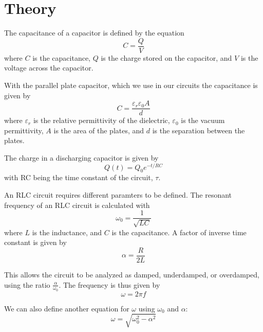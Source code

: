 \documentclass[11pt]{article}
\let\oldsection\section
\renewcommand\section{\clearpage\oldsection}
\begin{document}
    \section*{Theory}\label{sec:theory}

    The capacitance of a capacitor is defined by the equation
    \begin{equation}
        C = \frac{Q}{V}
    \end{equation}\label{eq:capacitance}
    where $C$ is the capacitance, $Q$ is the charge stored on the capacitor, and $V$ is the voltage across the capacitor.

    With the parallel plate capacitor, which we use in our circuits the capacitance is given by
    \begin{equation}
        C = \frac{\varepsilon_r \varepsilon_0 A}{d}
    \end{equation}\label{eq:parallel-plate-capacitance}
    where $\varepsilon_r$ is the relative permittivity of the dielectric, $\varepsilon_0$ is the vacuum permittivity, $A$ is the area of the plates, and $d$ is the separation between the plates.

    The charge in a discharging capacitor is given by
    \begin{equation}
        Q(t) = Q_0 e^{-t/RC}
    \end{equation}\label{eq:discharging-capacitor}
    with RC being the time constant of the circuit, $\tau$.

    An RLC circuit requires different paramters to be defined.
    The resonant frequency of an RLC circuit is calculated with
    \begin{equation}
        \omega_0 = \frac{1}{\sqrt{LC}}
    \end{equation}\label{eq:omega-0}
    where $L$ is the inductance, and $C$ is the capacitance.
    A factor of inverse time constant is given by
    \begin{equation}
        \alpha = \frac{R}{2L}
    \end{equation}\label{eq:alpha}

    This allows the circuit to be analyzed as damped, underdamped, or overdamped, using the ratio $\frac{\alpha}{\omega_0}$.
    The frequency is thus given by
    \begin{equation}
        \omega = 2\pi f
    \end{equation}\label{eq:frequency}

    We can also define another equation for ${\omega}$ using ${\omega_0}$ and ${\alpha}$:
    \begin{equation}
        \omega = \sqrt{\omega_0^2 - \alpha^2}
    \end{equation}\label{eq:omega}
\end{document}
